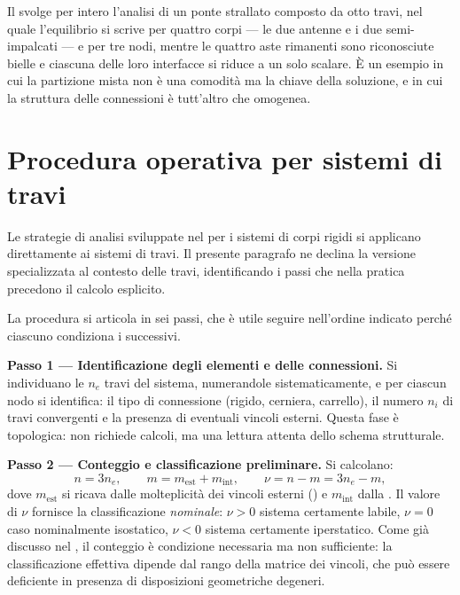 \begin{oss}
	Il  svolge per intero
	l'analisi di un ponte strallato composto da otto travi,
	nel quale l'equilibrio si scrive per quattro corpi ---
	le due antenne e i due semi-impalcati --- e per tre nodi,
	mentre le quattro aste rimanenti sono riconosciute
	bielle e ciascuna delle loro interfacce si riduce a un
	solo scalare. È un esempio in cui la partizione mista non
	è una comodità ma la chiave della soluzione, e in cui la
	struttura delle connessioni è tutt'altro che omogenea.
\end{oss}



\section{Procedura operativa per sistemi di travi}
\label{sec:procedura_operativa}

Le strategie di analisi sviluppate nel
 per i sistemi di
corpi rigidi si applicano direttamente ai sistemi di
travi. Il presente paragrafo ne declina la versione
specializzata al contesto delle travi, identificando
i passi che nella pratica precedono il calcolo esplicito.

La procedura si articola in sei passi, che è utile
seguire nell'ordine indicato perché ciascuno condiziona
i successivi.

\medskip
\noindent\textbf{Passo 1 — Identificazione degli elementi
	e delle connessioni.}
Si individuano le $n_e$ travi del sistema, numerandole
sistematicamente, e per ciascun nodo si identifica:
il tipo di connessione (rigido, cerniera, carrello),
il numero $n_i$ di travi convergenti e la presenza
di eventuali vincoli esterni. Questa fase è topologica:
non richiede calcoli, ma una lettura attenta dello
schema strutturale.

\medskip
\noindent\textbf{Passo 2 — Conteggio e classificazione
	preliminare.}
Si calcolano:
\begin{equation}\label{eq:conteggio_travi}
	n = 3n_e, \qquad
	m = m_{\text{est}} + m_{\text{int}}, \qquad
	\nu = n - m = 3n_e - m,
\end{equation}
dove $m_{\text{est}}$ si ricava dalle molteplicità dei
vincoli esterni () e
$m_{\text{int}}$ dalla .
Il valore di $\nu$ fornisce la classificazione
\emph{nominale}: $\nu > 0$ sistema certamente labile,
$\nu = 0$ caso nominalmente isostatico, $\nu < 0$
sistema certamente iperstatico. Come già discusso nel
, il conteggio è
condizione necessaria ma non sufficiente: la
classificazione effettiva dipende dal rango della
matrice dei vincoli, che può essere deficiente in
presenza di disposizioni geometriche degeneri.

